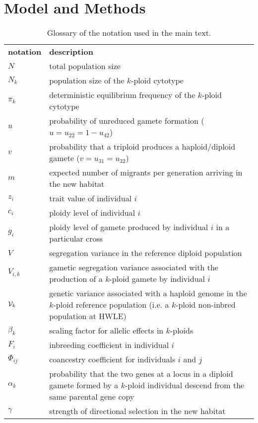 \documentclass[12pt,a4paper]{article}
\begin{document}
    \section*{Model and Methods}

    \begin{table}[t]
    \caption{Glossary of the notation used in the main text.
    } \label{tbl:glossary}
    \centering
    \small
    \begin{tabularx}{\linewidth}{lX}
    \cline{1-2}
    \textbf{notation}   & \textbf{description}   \\ \cline{1-2}
    $N$ & total population size\\
    $N_k$ & population size of the $k$-ploid cytotype \\
    $\pi_k$ & deterministic equilibrium frequency of the $k$-ploid cytotype \\
    $u$ & probability of unreduced gamete formation ($u=u_{22}=1-u_{42}$)\\
    $v$ & probability that a triploid produces a haploid/diploid gamete
      ($v=u_{31}=u_{32}$)\\
    $m$ & expected number of migrants per generation arriving in the new habitat \\
    $z_i$ & trait value of individual $i$ \\
    $c_i$ & ploidy level of individual $i$ \\
    $g_i$ & ploidy level of gamete produced by individual $i$ in a particular cross\\
    $V$ & segregation variance in the reference diploid population \\
    $V_{i,k}$ & gametic segregation variance associated with the production of a
      $k$-ploid gamete by individual $i$ \\
    $\mathcal{V}_k$ & genetic variance associated with a haploid genome in the $k$-ploid
      reference population (i.e. a $k$-ploid non-inbred population at HWLE) \\
    $\beta_{k}$ & scaling factor for allelic effects in $k$-ploids \\
    $F_i$ & inbreeding coefficient in individual $i$ \\
    $\Phi_{ij}$ & coancestry coefficient for individuals $i$ and $j$ \\
    $\alpha_k$ & probability that the two genes at a locus in a diploid gamete
      formed by a $k$-ploid individual descend from the same parental gene copy\\
    $\gamma$ & strength of directional selection in the new habitat\\

\end{tabularx}
\end{table}
\end{document}
